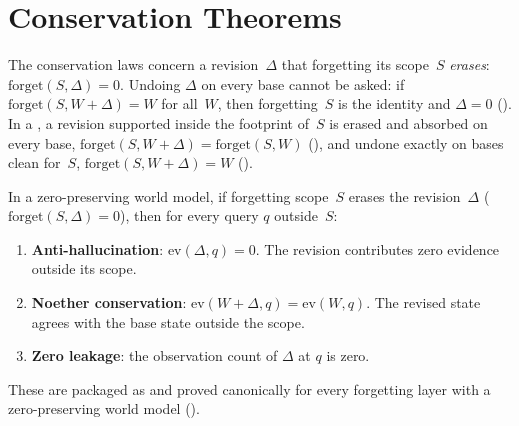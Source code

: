 \documentclass[11pt,openany]{report}
\begin{document}

\section{Conservation Theorems}

The conservation laws concern a revision~$\Delta$ that forgetting its
scope~$S$ \emph{erases}: $\mathrm{forget}(S, \Delta) = 0$.  Undoing
$\Delta$ on every base cannot be asked: if
$\mathrm{forget}(S, W + \Delta) = W$ for all~$W$, then forgetting~$S$ is
the identity and $\Delta = 0$ ().
In a , a revision supported inside
the footprint of~$S$ is erased and absorbed on every base,
$\mathrm{forget}(S, W + \Delta) = \mathrm{forget}(S, W)$
(), and undone exactly on bases clean
for~$S$, $\mathrm{forget}(S, W + \Delta) = W$
().

\begin{theorem}
\label{thm:conservation}
In a zero-preserving world model, if forgetting scope~$S$ erases the
revision~$\Delta$ ($\mathrm{forget}(S, \Delta) = 0$), then for every
query $q$ outside~$S$:
\begin{enumerate}
\item \textbf{Anti-hallucination}: $\mathrm{ev}(\Delta, q) = 0$.
  The revision contributes zero evidence outside its scope.
\item \textbf{Noether conservation}: $\mathrm{ev}(W + \Delta, q) =
  \mathrm{ev}(W, q)$.  The revised state agrees with the base state
  outside the scope.
\item \textbf{Zero leakage}: the observation count of $\Delta$ at $q$
  is zero.
\end{enumerate}
\end{theorem}

\noindent
These are packaged as  and proved
canonically for every forgetting layer with a zero-preserving world
model ().
\end{document}
